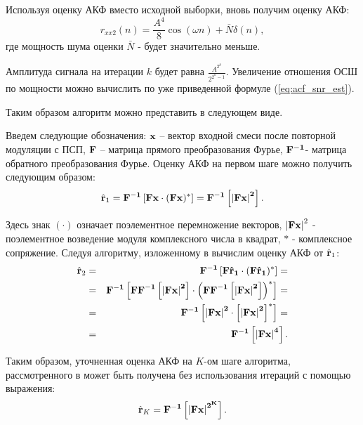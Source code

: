 Используя оценку АКФ вместо исходной выборки, вновь получим оценку АКФ:
\begin{equation}
	r_{xx2}(n) = \frac{A^4}{8} \cos{(\omega n)} + \bar{N} \delta{(n)},
\end{equation}
где мощность шума оценки ${\bar{N}}$ - будет значительно меньше.

Амплитуда сигнала на итерации ${k}$ будет равна ${\frac{A^{2^k}}{2^{2^k-1}}}$. Увеличение отношения ОСШ по мощности можно
вычислить по уже приведенной формуле (\ref{eq:acf_snr_est}). 

Таким образом алгоритм можно представить в следующем виде.

Введем следующие обозначения: ${\bf{x}}$ – вектор входной смеси после повторной модуляции с ПСП, ${\bf{F}}$ – матрица прямого преобразования Фурье,
${\bf{F}^{-1}}$- матрица обратного преобразования Фурье.  Оценку АКФ на первом шаге можно получить следующим образом:
\begin{equation}
	\label{eq:akf_1}
	\hat{\bf{r}}_1 = \bf{F}^{-1}\left[ \bf{Fx} \cdot (\bf{Fx})^* \right] = \bf{F}^{-1} \left[ \left| \bf{Fx} \right| ^2 \right].
\end{equation}

Здесь знак ${(\cdot)}$  означает поэлементное перемножение векторов, ${\left| \bf{Fx} \right| ^2}$ - поэлементное возведение модуля комплексного числа в квадрат, ${*}$ -
комплексное сопряжение.  Следуя алгоритму, изложенному в \cite{ostanin_akf} вычислим оценку АКФ от ${\hat{\bf{r}}_1}$:
\begin{eqnarray}
	\label{eq:akf_2}
	\hat{\bf{r}}_2 & = & \bf{F}^{-1}\left[ \bf{F} \hat{\bf{r}}_1 \cdot (\bf{F} \hat{\bf{r}}_1)^* \right] = \nonumber \\
		& = & \bf{F}^{-1}	\left[ 
				\bf{FF}^{-1} \left[
						\left| \bf{Fx} \right| ^2
					\right]
						\cdot \left( \bf{FF}^{-1} \left[ \left| \bf{Fx} \right| ^2 \right]
					\right) ^*
			\right] = \nonumber \\
		& = & \bf{F}^{-1} \left[ \left| \bf{Fx} \right| ^2 \cdot \left[ \left| \bf{Fx} \right| ^2 \right] ^* \right] =  \nonumber \\
		& = & \bf{F}^{-1} \left[ \left| \bf{Fx} \right| ^4 \right].
\end{eqnarray}

Таким образом, уточненная оценка АКФ на ${K}$-ом шаге алгоритма, рассмотренного в \cite{ostanin_akf}
может быть получена без использования итераций с помощью выражения:
\begin{equation}
	\label{eq:akf_3}
	\hat{\bf{r}}_K = \bf{F}^{-1}\left[ \left| \bf{Fx} \right| ^{2^K} \right].
\end{equation}

